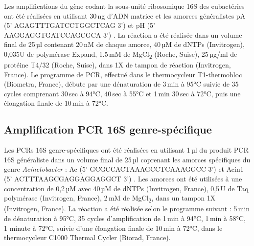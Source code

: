 Les amplifications du gène codant la sous-unité ribosomique 16S des eubactéries ont été réalisées en utilisant 30\,ng d'ADN matrice et les amorces généralistes pA (5' AGAGTTTGATCCTGGCTCAG 3') et pH (5' AAGGAGGTGATCCAGCGCA 3') \cite{edwards1989}.
La réaction a été réalisée dans un volume final de 25\,µl contenant 20\,nM de chaque amorce, 40\,µM de dNTPs (Invitrogen), 0,035U de polymérase Expand, 1.5\,mM de MgCl\textsubscript{2} (Roche, Suise), 25\,µg/ml de protéine T4/32 (Roche, Suise), dans 1X de tampon de réaction (Invitrogen, France).
Le programme de PCR, effectué dans le thermocycleur T1-thermobloc (Biometra, France), débute par une dénaturation de 3\,min à 95°C suivie de 35 cycles comprenant 30\,sec à 94°C, 40\,sec à 55°C et 1\,min 30\,sec à 72°C, puis une élongation finale de 10\,min à 72°C.

\subsection{Amplification PCR 16S genre-spécifique}

Les PCRs 16S genre-spécifiques ont été réalisées en utilisant 1\,µl du produit PCR 16S généraliste dans un volume final de 25\,µl coprenant les amorces spécifiques du genre \textit{Acinetobacter} : Ac (5' GCGCCACTAAAGCCTCAAAGGCC 3') \cite{kenzaka1998} et Acin1 (5' ACTTTAAGCGAGGAGGAGGCT 3') \cite{sanguin2006}.
Les amorces ont été utilisées à une concentration de 0,2\,µM avec 40\,µM de dNTPs (Invitrogen, France), 0,5\,U de Taq polymérase (Invitrogen, France), 2\,mM de MgCl\textsubscript{2}, dans un tampon 1X (Invitrogen, France).
La réaction a été réalisée selon le programme suivant : 5\,min de dénaturation à 95°C, 35 cycles d'amplification de 1\,min à 94°C, 1\,min à 58°C, 1 minute à 72°C, suivie d'une élongation finale de 10\,min à 72°C, dans le thermocycleur C1000 Thermal Cycler (Biorad, France).